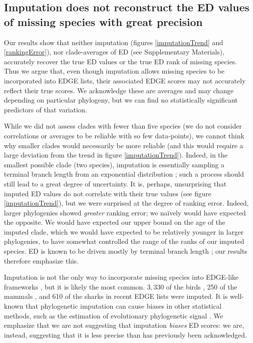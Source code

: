 \documentclass[10pt,english]{article}
\begin{document}
\subsection*{Imputation does not reconstruct the ED values of missing species with great precision}
Our results show that neither imputation (figures \ref{imputationTrend} and
\ref{rankingError}), nor clade-averages of ED (see Supplementary Materials),
accurately recover the true ED values or the true ED rank of missing species.
Thus we argue that, even though imputation allows missing species to be
incorporated into EDGE lists, their associated EDGE scores may not accurately
reflect their true scores. We acknowledge these are averages and may change
depending on particular phylogeny, but we can find no statistically significant
predictors of that variation.

While we did not assess clades with fewer than five species (we do not consider
correlations or averages to be reliable with so few data-points), we cannot
think why smaller clades would necessarily be more reliable (and this would
require a large deviation from the trend in figure \ref{imputationTrend}). Indeed, in the smallest
possible clade (two species), imputation is essentially sampling a terminal
branch length from an exponential distribution \autocite{Kuhn2011}; such a
process should still lead to a great degree of uncertainty. It is, perhaps,
unsurprising that imputed ED values do not correlate with their true values (see
figure \ref{imputationTrend}), but we were surprised at the degree of ranking error.
Indeed, larger phylogenies showed \emph{greater} ranking error; we na\"{i}vely
would have expected the opposite. We would have expected our upper bound on the
age of the imputed clade, which we would have expected to be relatively younger
in larger phylogenies, to have somewhat controlled the range of the ranks of our
imputed species. ED is known to be driven mostly by terminal branch length
\autocite{Isaac2007, Steel2007, Redding2008}; our results therefore emphasize
this.

Imputation is not the only way to incorporate missing species into EDGE-like
frameworks \autocite[see][]{Collen2011,Gumbs2018}, but it is likely the most common.
$3,330$ of the birds \autocite[\textasciitilde30\%;][]{Jetz2014}, 250 of the mammals
\autocite[\textasciitilde 5.6\%;][]{Collen2011}, and 610 of the sharks
\autocite[\textasciitilde49\%;][]{Stein2018} in recent EDGE lists were imputed.
It is well-known that phylogenetic imputation can cause biases in other
statistical methods, such as the estimation of evolutionary phylogenetic signal
\autocite{Rabosky2015}. We emphasize that we are not suggesting that imputation
\emph{biases} ED scores: we are, instead, suggesting that it is less precise
than has previously been acknowledged.
\end{document}
